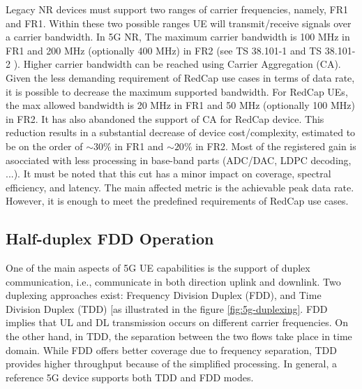 \documentclass[conference]{IEEEtran}
\begin{document}
Legacy NR devices must support two ranges of carrier frequencies, namely, FR1 and FR1. Within these two possible ranges UE will transmit/receive signals over a carrier bandwidth. In 5G NR, The maximum carrier bandwidth is 100 MHz in FR1 and 200 MHz (optionally 400 MHz) in FR2 (see TS 38.101-1 \cite{3gpp_nr_nodate-2_38.101-1} and TS 38.101-2 \cite{3gpp.38.101-2}). Higher carrier bandwidth can be reached using Carrier Aggregation (CA).
Given the less demanding requirement of RedCap use cases in terms of data rate, it is possible to decrease the maximum supported bandwidth. For RedCap UEs, the max allowed bandwidth is 20 MHz in  FR1 and 50 MHz (optionally 100 MHz) in FR2. It has also abandoned the support of CA for RedCap device.
This reduction results in a substantial decrease of device cost/complexity, estimated to be on the order of $\sim30\%$ in FR1 and $\sim20\%$ in  FR2. Most of the registered gain is asocciated with less processing in base-band parts (ADC/DAC, LDPC decoding, ...).
It must be noted that this cut has a minor impact on coverage, spectral efficiency, and latency. The main affected metric is the achievable peak data rate. However, it is enough to meet the predefined requirements of RedCap use cases.

\subsection{Half-duplex FDD Operation}
\label{sec:4-3}


One of the main aspects of 5G UE capabilities is the support of duplex communication, i.e., communicate in both direction uplink and downlink. Two duplexing approaches exist: Frequency Division Duplex (FDD), and Time Division Duplex (TDD) [as illustrated in the figure \ref{fig:5g-duplexing}. FDD implies that UL and DL transmission occurs on different carrier frequencies. On the other hand, in TDD, the separation between the two flows take place in time domain. 
 While FDD offers better coverage due to frequency separation, TDD provides higher throughput because of the simplified processing. In general, a reference 5G device supports both TDD and FDD modes.
 
\end{document}

